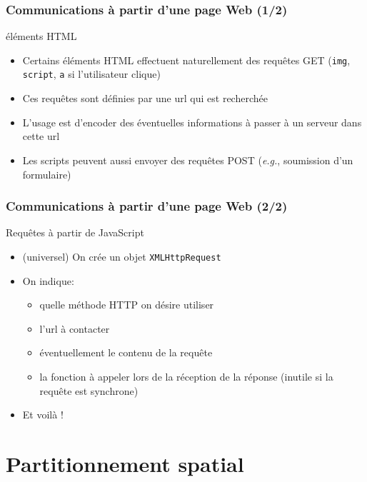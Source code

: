 \begin{reveals}
\begin{frame}
  \frametitle{Communications {\`a} partir d'une page Web (1/2)}

  \begin{block}{{\'e}l{\'e}ments HTML}
    \begin{itemize}
    \item Certains {\'e}l{\'e}ments HTML effectuent naturellement des requ{\^e}tes
      GET (\texttt{img}, \texttt{script}, \texttt{a} si l'utilisateur clique)
    \item Ces requ{\^e}tes sont d{\'e}finies par une url qui est recherch{\'e}e
    \item L'usage est d'encoder des {\'e}ventuelles informations {\`a} passer
      {\`a} un serveur dans cette url
    \item Les scripts peuvent aussi envoyer des requ{\^e}tes POST
      (\textit{e.g.}, soumission d'un formulaire)
    \end{itemize}
  \end{block}


\end{frame}


\begin{frame}
  \frametitle{Communications {\`a} partir d'une page Web (2/2)}

  \begin{block}{Requ{\^e}tes {\`a} partir de JavaScript}
    \begin{itemize}
    \item (universel) On cr{\'e}e un objet \texttt{XMLHttpRequest}
    \item On indique:
      \begin{itemize}
      \item quelle m{\'e}thode HTTP on d{\'e}sire utiliser 
      \item l'url {\`a} contacter
      \item {\'e}ventuellement le contenu de la requ{\^e}te
      \item la fonction {\`a} appeler lors de la r{\'e}ception de la r{\'e}ponse
        (inutile si la requ{\^e}te est synchrone)
      \end{itemize}
    \item Et voil{\`a} !
    \end{itemize}
  \end{block}

\end{frame}

\section{Partitionnement spatial}



\end{reveals}
